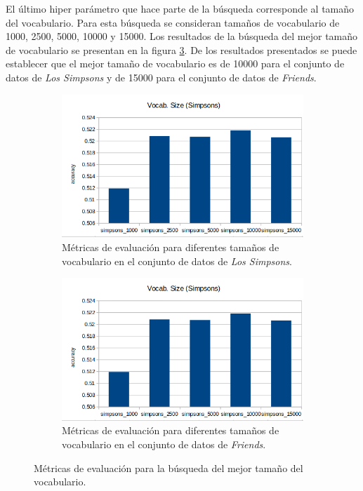 El último hiper parámetro que hace parte de la búsqueda corresponde al tamaño del vocabulario. Para esta búsqueda se consideran tamaños de vocabulario de 1000, 2500, 5000, 10000 y 15000. Los resultados de la búsqueda del mejor tamaño de vocabulario se presentan en la figura \ref{fig:em_vocabulary_size}. De los resultados presentados se puede establecer que el mejor tamaño de vocabulario es de 10000 para el conjunto de datos de \textit{Los Simpsons} y de 15000 para el conjunto de datos de \textit{Friends}.

\begin{figure}[H]
    \centering
    \begin{subfigure}[b]{0.45\textwidth}
        \centering
        \includegraphics[width=\textwidth]{doc/images/em_models/vocab_size_simpsons.png}
        \caption{Métricas de evaluación para diferentes tamaños de vocabulario en el conjunto de datos de \textit{Los Simpsons}.}
        \label{fig:em_vocabulary_size_simpsons}
    \end{subfigure}
    \hfill
    \begin{subfigure}[b]{0.45\textwidth}
        \centering
        \includegraphics[width=\textwidth]{doc/images/em_models/vocab_size_simpsons.png}
        \caption{Métricas de evaluación para diferentes tamaños de vocabulario en el conjunto de datos de \textit{Friends}.}
        \label{fig:em_vocabulary_size_friends}
    \end{subfigure}
    \caption{Métricas de evaluación para la búsqueda del mejor tamaño del vocabulario.}
    \label{fig:em_vocabulary_size}
\end{figure}

